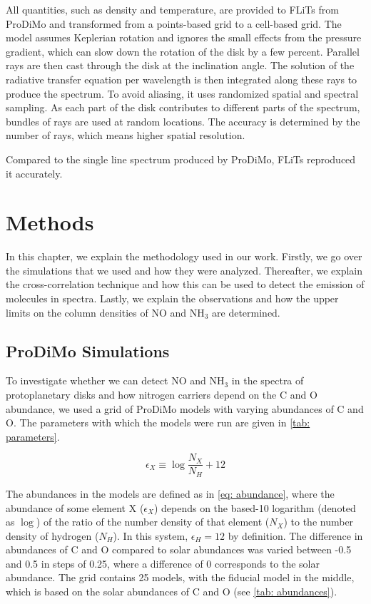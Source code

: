 \documentclass[oneside, single, authoryear, semicolon, 12pt]{lion-msc}
\newcommand{\4}{$_4$}
\newcommand{\3}{$_3$}
\newcommand{\2}{$_2$}
\begin{document}
All quantities, such as density and temperature, are provided to FLiTs from ProDiMo and transformed from a points-based grid to a cell-based grid. The model assumes Keplerian rotation and ignores the small effects from the pressure gradient, which can slow down the rotation of the disk by a few percent. Parallel rays are then cast through the disk at the inclination angle. The solution of the radiative transfer equation per wavelength is then integrated along these rays to produce the spectrum. To avoid aliasing, it uses randomized spatial and spectral sampling. As each part of the disk contributes to different parts of the spectrum, bundles of rays are used at random locations. The accuracy is determined by the number of rays, which means higher spatial resolution.

Compared to the single line spectrum produced by ProDiMo, FLiTs reproduced it accurately. 




\chapter{Methods}\label{Ch: Methods}
In this chapter, we explain the methodology used in our work. Firstly, we go over the simulations that we used and how they were analyzed. Thereafter, we explain the cross-correlation technique and how this can be used to detect the emission of molecules in spectra. Lastly, we explain the observations and how the upper limits on the column densities of NO and NH\3 are determined.

\section{ProDiMo Simulations}
To investigate whether we can detect NO and NH\3 in the spectra of protoplanetary disks and how nitrogen carriers depend on the C and O abundance, we used a grid of ProDiMo models with varying abundances of C and O. The parameters with which the models were run are given in \autoref{tab: parameters}.

\begin{equation}
    \epsilon_X\equiv\log\frac{N_X}{N_H}+12
\label{eq: abundance}
\end{equation}

The abundances in the models are defined as in \autoref{eq: abundance}, where the abundance of some element X ($\epsilon_X$) depends on the based-10 logarithm (denoted as $\log$) of the ratio of the number density of that element ($N_X$) to the number density of hydrogen ($N_H$). In this system, $\epsilon_H=12$ by definition. The difference in abundances of C and O compared to solar abundances was varied between -0.5 and 0.5 in steps of 0.25, where a difference of 0 corresponds to the solar abundance. The grid contains 25 models, with the fiducial model in the middle, which is based on the solar abundances of C and O (see \autoref{tab: abundances}).
\end{document}
